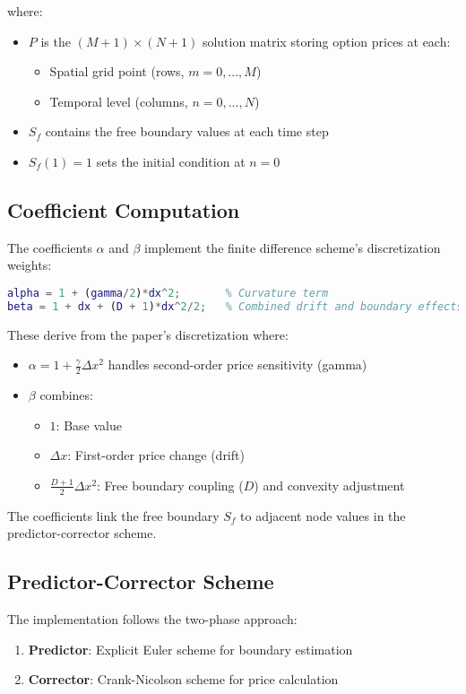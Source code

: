 \documentclass[12pt]{article}
\begin{document}
where:
\begin{itemize}
    \item $P$ is the $(M+1)\times(N+1)$ solution matrix storing option prices at each:
    \begin{itemize}
        \item Spatial grid point (rows, $m = 0,...,M$)
        \item Temporal level (columns, $n = 0,...,N$)
    \end{itemize}
    \item $S_f$ contains the free boundary values at each time step
    \item $S_f(1)=1$ sets the initial condition at $n=0$
\end{itemize}
\subsection{Coefficient Computation}
The coefficients $\alpha$ and $\beta$ implement the finite difference scheme's discretization weights:

\begin{lstlisting}[language=Matlab]
alpha = 1 + (gamma/2)*dx^2;       % Curvature term
beta = 1 + dx + (D + 1)*dx^2/2;   % Combined drift and boundary effects
\end{lstlisting}

These derive from the paper's discretization where:
\begin{itemize}
\item $\alpha = 1 + \frac{\gamma}{2}\Delta x^2$ handles second-order price sensitivity (gamma)
\item $\beta$ combines:
  \begin{itemize}
  \item $1$: Base value
  \item $\Delta x$: First-order price change (drift)
  \item $\frac{D+1}{2}\Delta x^2$: Free boundary coupling ($D$) and convexity adjustment
  \end{itemize}
\end{itemize}
The coefficients link the free boundary $S_f$ to adjacent node values in the predictor-corrector scheme.
\subsection{Predictor-Corrector Scheme}
The implementation follows the two-phase approach:

\begin{enumerate}
    \item \textbf{Predictor}: Explicit Euler scheme for boundary estimation
    \item \textbf{Corrector}: Crank-Nicolson scheme for price calculation
\end{enumerate}
\end{document}
